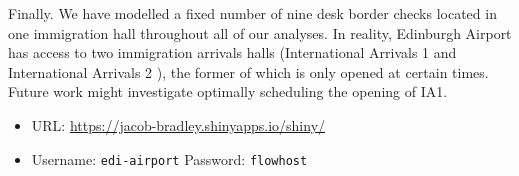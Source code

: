\documentclass[10pt]{article}
\begin{document}
Finally. We have modelled a fixed number of nine desk border checks located in one immigration hall throughout all of our analyses. In reality, Edinburgh Airport has access to two immigration arrivals halls (International Arrivals 1 and International Arrivals 2 \cite{international_arrivals}), the former of which is only opened at certain times. Future work might investigate optimally scheduling the opening of IA1.



\begin{tcolorbox}[
colframe=edi-dark-purple,
colback=edi-light-purple,
fonttitle=\bfseries,
title = {Use our Shiny Application to interactively explore demand scenarios!}]
\begin{itemize}
\item URL: \url{https://jacob-bradley.shinyapps.io/shiny/}
\item Username: \texttt{edi-airport} \quad Password: \texttt{flowhost}
\end{itemize}


\end{tcolorbox}

{\footnotesize
}
% 
\end{document}

